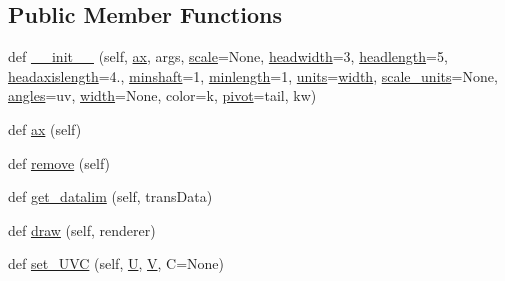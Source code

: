 \subsection*{Public Member Functions}
\begin{DoxyCompactItemize}
\item 
def \hyperlink{classmatplotlib_1_1quiver_1_1Quiver_ab33a1afc67b51facb4060e0038017456}{\+\_\+\+\_\+init\+\_\+\+\_\+} (self, \hyperlink{classmatplotlib_1_1quiver_1_1Quiver_ae04f59d5391cda9f45331f602d5bde48}{ax}, args, \hyperlink{classmatplotlib_1_1quiver_1_1Quiver_ad19d68817128173ecff9b52c278398e6}{scale}=None, \hyperlink{classmatplotlib_1_1quiver_1_1Quiver_a19f9949aae4a40be8613571cb993ecc7}{headwidth}=3, \hyperlink{classmatplotlib_1_1quiver_1_1Quiver_a2b589ea0865f3f79f62be6f2eb3020e8}{headlength}=5, \hyperlink{classmatplotlib_1_1quiver_1_1Quiver_a096bdd76c5e18fbab50f1ba1ba86d20f}{headaxislength}=4., \hyperlink{classmatplotlib_1_1quiver_1_1Quiver_ab8494be335d6a191390160a70ee5993a}{minshaft}=1, \hyperlink{classmatplotlib_1_1quiver_1_1Quiver_ad055632c48288f5957e20394aaa4dadd}{minlength}=1, \hyperlink{classmatplotlib_1_1quiver_1_1Quiver_a8161b4d5e462074e7bc03d0927b340d3}{units}=\textquotesingle{}\hyperlink{classmatplotlib_1_1quiver_1_1Quiver_a75d5ada927ce226d1e4660ec95b2bf75}{width}\textquotesingle{}, \hyperlink{classmatplotlib_1_1quiver_1_1Quiver_a77b683fa90568c01daa48255549f7df3}{scale\+\_\+units}=None, \hyperlink{classmatplotlib_1_1quiver_1_1Quiver_a7992830d6364ca79bd57bf6152486ad3}{angles}=\textquotesingle{}uv\textquotesingle{}, \hyperlink{classmatplotlib_1_1quiver_1_1Quiver_a75d5ada927ce226d1e4660ec95b2bf75}{width}=None, color=\textquotesingle{}k\textquotesingle{}, \hyperlink{classmatplotlib_1_1quiver_1_1Quiver_a75cec728016eb0e4cb1d97a8bbb80e95}{pivot}=\textquotesingle{}tail\textquotesingle{}, kw)
\item 
def \hyperlink{classmatplotlib_1_1quiver_1_1Quiver_ae04f59d5391cda9f45331f602d5bde48}{ax} (self)
\item 
def \hyperlink{classmatplotlib_1_1quiver_1_1Quiver_a03ea59d5ab5d543facf2f2081f2a82b1}{remove} (self)
\item 
def \hyperlink{classmatplotlib_1_1quiver_1_1Quiver_aed27edde1c71f87b34a658f42246de0d}{get\+\_\+datalim} (self, trans\+Data)
\item 
def \hyperlink{classmatplotlib_1_1quiver_1_1Quiver_ab7b26b151a2c4c8704df5e938f025573}{draw} (self, renderer)
\item 
def \hyperlink{classmatplotlib_1_1quiver_1_1Quiver_a4b4f628105af4aa7efcc91b9eb721c59}{set\+\_\+\+U\+VC} (self, \hyperlink{classmatplotlib_1_1quiver_1_1Quiver_af99b7eb713d591fc05bc8747234fe1ba}{U}, \hyperlink{classmatplotlib_1_1quiver_1_1Quiver_a8374c536876a49808765bc6eef6114a7}{V}, C=None)
\end{DoxyCompactItemize}
